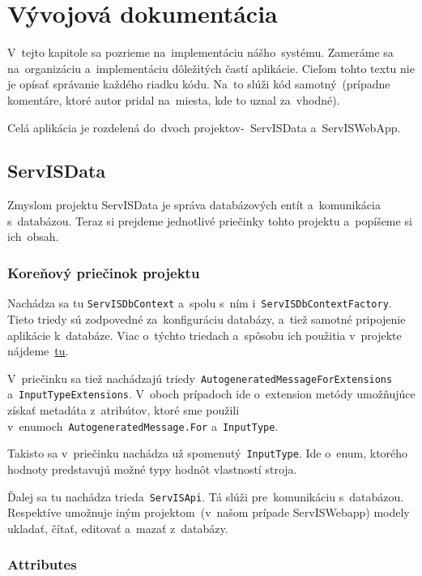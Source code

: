\chapter{Vývojová dokumentácia}

V~tejto kapitole sa pozrieme na~implementáciu nášho~systému. Zameráme sa na~organizáciu a~implementáciu dôležitých častí aplikácie. Cieľom tohto textu nie je opísať správanie každého riadku kódu. Na~to slúži kód samotný~(prípadne komentáre, ktoré autor pridal na~miesta, kde to uznal za~vhodné).

Celá aplikácia je rozdelená do~dvoch projektov-~ServISData a~ServISWebApp.

\section{ServISData}

Zmyslom projektu ServISData je správa databázových entít a~komunikácia s~databázou. Teraz si prejdeme jednotlivé priečinky tohto projektu a~popíšeme si ich~obsah.

\subsection{Koreňový priečinok projektu}

Nachádza sa tu \verb|ServISDbContext| a~spolu s~ním i~\verb|ServISDbContextFactory|. Tieto triedy sú zodpovedné za~konfiguráciu databázy, a~tiež samotné pripojenie aplikácie k~databáze. Viac o~týchto triedach a~spôsobu ich použitia v~projekte nájdeme~\href{https://learn.microsoft.com/en-us/ef/core/dbcontext-configuration/\#using-a-dbcontext-factory-eg-for-blazor}{tu}.

V~priečinku sa tiež nachádzajú triedy~\verb|AutogeneratedMessageForExtensions| a~\verb|InputTypeExtensions|. V~oboch prípadoch ide o~extension metódy umožňujúce získať metadáta z~atribútov, ktoré sme použili v~enumoch~\verb|AutogeneratedMessage.For| a~\verb|InputType|.

Takisto sa v~priečinku nachádza už spomenutý~\verb|InputType|. Ide o~enum, ktorého hodnoty predstavujú možné typy hodnôt vlastností stroja.

Ďalej sa tu nachádza trieda~\verb|ServISApi|. Tá slúži pre~komunikáciu s~databázou. Respektíve umožnuje iným projektom~(v~našom prípade ServISWebapp) modely ukladať, čítať, editovať a~mazať z~databázy.

\subsection{Attributes}

